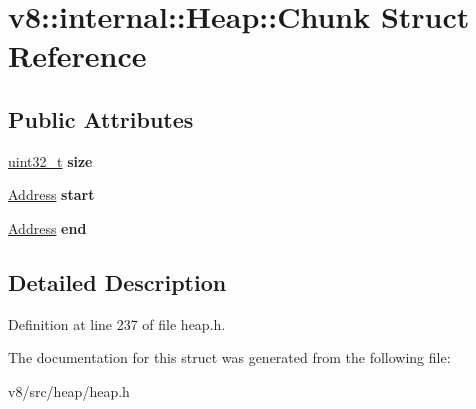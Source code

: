 \hypertarget{structv8_1_1internal_1_1Heap_1_1Chunk}{}\section{v8\+:\+:internal\+:\+:Heap\+:\+:Chunk Struct Reference}
\label{structv8_1_1internal_1_1Heap_1_1Chunk}
\subsection*{Public Attributes}
\begin{DoxyCompactItemize}
\item 
\mbox{\label{structv8_1_1internal_1_1Heap_1_1Chunk_ae3e180f5b7266142631483907c1aae8d}} 
\mbox{\hyperlink{classuint32__t}{uint32\+\_\+t}} {\bfseries size}
\item 
\mbox{\label{structv8_1_1internal_1_1Heap_1_1Chunk_a8c8281ad02fc580310c92ac8c5aa786f}} 
\mbox{\hyperlink{classuintptr__t}{Address}} {\bfseries start}
\item 
\mbox{\label{structv8_1_1internal_1_1Heap_1_1Chunk_a633e27a9bcce2e21a25585ef0f9120f1}} 
\mbox{\hyperlink{classuintptr__t}{Address}} {\bfseries end}
\end{DoxyCompactItemize}


\subsection{Detailed Description}


Definition at line 237 of file heap.\+h.



The documentation for this struct was generated from the following file\+:\begin{DoxyCompactItemize}
\item 
v8/src/heap/heap.\+h\end{DoxyCompactItemize}
